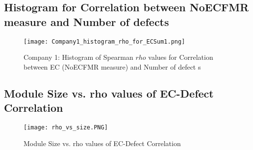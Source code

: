 \documentclass[times]{smrauth}
\begin{document}
\begin{table*}[ht]
\caption{Spearman Correlation Results of the Process Metrics} 
\label {tab:Correlations} 
\begin{center}
\end{center}
\end{table*}


\subsection{Histogram for Correlation between NoECFMR measure and Number of  defects}

\begin{figure}[h]
\centering
\texttt{[image: Company1\_histogram\_rho\_for\_ECSum1.png]}
\caption{Company 1: Histogram of Spearman $rho$ values for Correlation between EC (NoECFMR measure) and Number of  defect s}
\label{Company1_histogram_rho_noecfmr}	
\end{figure}


\newpage


\subsection{Module Size vs. rho values of EC-Defect Correlation}

\begin{figure*}[!h]
\centering
\texttt{[image: rho\_vs\_size.PNG]}
\caption{Module Size vs. rho values of EC-Defect Correlation}
\label{size_vs_correlation}	
\end{figure*}

\begin{table*}[ht]
\caption{Spearman Correlation Results} 
\label {tab:size_vs_correlation} 
\begin{center}
\end{center}
\end{table*}
\end{document}
